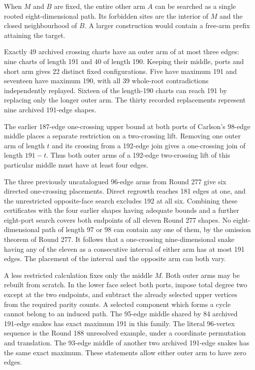 \documentclass[11pt,a4paper]{article}
\theoremstyle{definition}
\theoremstyle{remark}
\begin{document}
When \(M\) and \(B\) are fixed, the entire other arm \(A\) can be searched as a single rooted eight-dimensional path. Its forbidden sites are the interior of \(M\) and the closed neighbourhood of \(B\). A larger construction would contain a free-arm prefix attaining the target.

Exactly 49 archived crossing charts have an outer arm of at most three edges: nine charts of length 191 and 40 of length 190. Keeping their middle, ports and short arm gives 22 distinct fixed configurations. Five have maximum 191 and seventeen have maximum 190, with all 39 whole-root contradictions independently replayed. Sixteen of the length-190 charts can reach 191 by replacing only the longer outer arm. The thirty recorded replacements represent nine archived 191-edge shapes.

The earlier 187-edge one-crossing upper bound at both ports of Carlson's 98-edge middle places a separate restriction on a two-crossing lift. Removing one outer arm of length \(t\) and its crossing from a 192-edge join gives a one-crossing join of length \(191-t\). Thus both outer arms of a 192-edge two-crossing lift of this particular middle must have at least four edges.

The three previously uncatalogued 96-edge arms from Round 277 give six directed one-crossing placements. Direct regrowth reaches 181 edges at one, and the unrestricted opposite-face search excludes 192 at all six. Combining these certificates with the four earlier shapes having adequate bounds and a further eight-port search covers both endpoints of all eleven Round 277 shapes. No eight-dimensional path of length 97 or 98 can contain any one of them, by the omission theorem of Round 277. It follows that a one-crossing nine-dimensional snake having any of the eleven as a consecutive interval of either arm has at most 191 edges. The placement of the interval and the opposite arm can both vary.

A less restricted calculation fixes only the middle \(M\). Both outer arms may be rebuilt from scratch. In the lower face select both ports, impose total degree two except at the two endpoints, and subtract the already selected upper vertices from the required parity counts. A selected component which forms a cycle cannot belong to an induced path. The 95-edge middle shared by 84 archived 191-edge snakes has exact maximum 191 in this family. The literal 96-vertex sequence is the Round 188 unresolved example, under a coordinate permutation and translation. The 93-edge middle of another two archived 191-edge snakes has the same exact maximum. These statements allow either outer arm to have zero edges.
\end{document}
